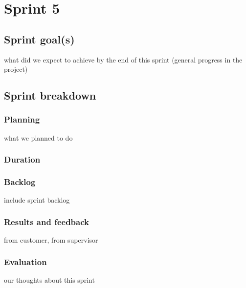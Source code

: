 

\chapter{Sprint 5}
\label{Sprint0}

\section{Sprint goal(s)}
what did we expect to achieve by the end of this sprint (general progress in the project)
\section{Sprint breakdown}
\subsection{Planning}
what we planned to do
\subsection{Duration}
\subsection{Backlog}
include sprint backlog
\subsection{Results and feedback}
from customer, from supervisor
\subsection{Evaluation}
our thoughts about this sprint
